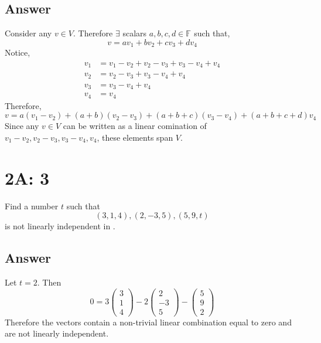 \documentclass[
	12pt, %
]{fphw}
\newcommand\R[1]{\text{$\mathbb{R}^{#1}$}}
\newcommand\F[1]{\text{$\mathbb{F}^{#1}$}}
\begin{document}
\subsection*{Answer} Consider any $v \in V$. Therefore $\exists$ scalars $a,b,c,d \in \F{}$ such that,
$$v = av_1 + bv_2 + cv_3 + dv_4$$
Notice, \begin{align*}
v_1 &= v_1-v_2 + v_2 - v_3 + v_3-v_4 + v_4\\
v_2 &= v_2 - v_3 + v_3-v_4 + v_4\\
v_3 &= v_3-v_4 + v_4\\
v_4 &= v_4
\end{align*}
Therefore,
$$
v = a(v_1-v_2) + (a+b)(v_2 - v_3) + (a+b+c)(v_3-v_4) + (a +b+c+d)v_4
$$
Since any $v \in V$ can be written as a linear comination of $v_1-v_2, v_2 - v_3, v_3-v_4, v_4$, these elements span $V$.



\section*{2A: 3}

\begin{problem}
Find a number $t$ such that 
$$(3,1,4), (2,-3,5), (5,9,t)$$
is not linearly independent in \R{3}.

\end{problem}


\subsection*{Answer} Let $t=2$. Then\\
$$
0 = 3
\begin{pmatrix}
3 \\
1\\
4
\end{pmatrix}
-2
\begin{pmatrix}
2 \\
-3\\
5
\end{pmatrix}-
\begin{pmatrix}
5 \\
9\\
2
\end{pmatrix}$$
Therefore the vectors contain a non-trivial linear combination equal to zero and are not linearly independent.
\end{document}
